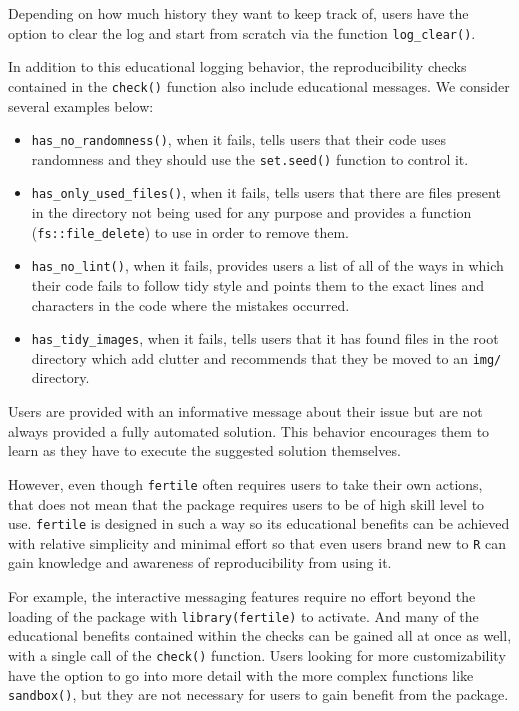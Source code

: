 \documentclass[12pt,twoside]{reedthesis}
\begin{document}
Depending on how much history they want to keep track of, users have the option to clear the log and start from scratch via the function \texttt{log\_clear()}.

In addition to this educational logging behavior, the reproducibility checks contained in the \texttt{check()} function also include educational messages. We consider several examples below:
\begin{itemize}
\item
  \texttt{has\_no\_randomness()}, when it fails, tells users that their code uses randomness and they should use the \texttt{set.seed()} function to control it.
\item
  \texttt{has\_only\_used\_files()}, when it fails, tells users that there are files present in the directory not being used for any purpose and provides a function (\texttt{fs::file\_delete}) to use in order to remove them.
\item
  \texttt{has\_no\_lint()}, when it fails, provides users a list of all of the ways in which their code fails to follow tidy style and points them to the exact lines and characters in the code where the mistakes occurred.
\item
  \texttt{has\_tidy\_images}, when it fails, tells users that it has found files in the root directory which add clutter and recommends that they be moved to an \texttt{img/} directory.
\end{itemize}
Users are provided with an informative message about their issue but are not always provided a fully automated solution. This behavior encourages them to learn as they have to execute the suggested solution themselves.

However, even though \texttt{fertile} often requires users to take their own actions, that does not mean that the package requires users to be of high skill level to use. \texttt{fertile} is designed in such a way so its educational benefits can be achieved with relative simplicity and minimal effort so that even users brand new to \texttt{R} can gain knowledge and awareness of reproducibility from using it.

For example, the interactive messaging features require no effort beyond the loading of the package with \texttt{library(fertile)} to activate. And many of the educational benefits contained within the checks can be gained all at once as well, with a single call of the \texttt{check()} function. Users looking for more customizability have the option to go into more detail with the more complex functions like \texttt{sandbox()}, but they are not necessary for users to gain benefit from the package.
\end{document}
